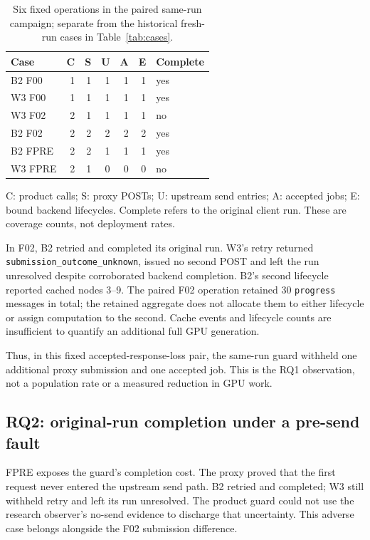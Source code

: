 \documentclass{ieeeaccess}
\begin{document}
\begin{table}[t]
\caption{Six fixed operations in the paired same-run campaign; separate from
the historical fresh-run cases in Table~\ref{tab:cases}.}
\label{tab:paired}
\centering
\begin{tabular}{lrrrrrl}
\hline
Case & C & S & U & A & E & Complete \\
\hline
B2 F00 & 1 & 1 & 1 & 1 & 1 & yes \\
W3 F00 & 1 & 1 & 1 & 1 & 1 & yes \\
W3 F02 & 2 & 1 & 1 & 1 & 1 & no \\
B2 F02 & 2 & 2 & 2 & 2 & 2 & yes \\
B2 FPRE & 2 & 2 & 1 & 1 & 1 & yes \\
W3 FPRE & 2 & 1 & 0 & 0 & 0 & no \\
\hline
\end{tabular}
\par\smallskip
\begin{minipage}{\columnwidth}\footnotesize\raggedright
C: product calls; S: proxy POSTs; U: upstream send entries; A: accepted jobs;
E: bound backend lifecycles. Complete refers to the original client run.
These are coverage counts, not deployment rates.
\end{minipage}
\end{table}

In F02, B2 retried and completed its original run. W3's retry returned
\texttt{submission\_outcome\_unknown}, issued no second POST and left the run
unresolved despite corroborated backend completion. B2's second lifecycle
reported cached nodes 3--9. The paired F02 operation retained 30
\texttt{progress} messages in total; the retained aggregate does not
allocate them to either lifecycle or assign computation to the second. Cache
events and lifecycle counts
are insufficient to quantify an additional full GPU generation.

Thus, in this fixed accepted-response-loss pair, the same-run guard withheld
one additional proxy submission and one accepted job. This is the RQ1
observation, not a population rate or a measured reduction in GPU work.

\subsection{RQ2: original-run completion under a pre-send fault}

FPRE exposes the guard's completion cost. The proxy proved that the first
request never entered the upstream send path. B2 retried and completed; W3
still withheld retry and left its run unresolved. The product guard could not
use the research observer's no-send evidence to discharge that uncertainty.
This adverse case belongs alongside the F02 submission difference.
\end{document}

